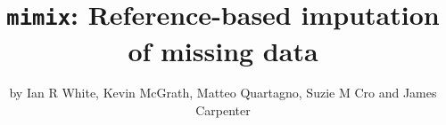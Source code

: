 



\newcommand {\varb}   [1] {{\rm var}\left(#1\right)}
\newcommand {\cov}    [2] {{\rm cov}\left(#1,#2\right)}
\newcommand {\cind}      {\mbox{$\perp\hspace{-0.5em}\perp$}}
\newcommand {\logit}  [1] {{\rm logit}\ #1}
\newcommand {\twovec}[2] {\left( \begin{array}{c} #1 \\ #2 \end{array} \right)}
\newcommand {\N} [2] {N\left(#1,#2\right)}

\newcommand {\pret}{{\le{t}}}
\newcommand {\postt}{{>t}}
\newcommand{\bX}{\boldsymbol{X}}
\newcommand{\bY}{\boldsymbol{Y}}
\newcommand {\tmax}{T} %
\newcommand{\KK}{k_1}



\title{\texttt{mimix}: Reference-based imputation of missing data}
\author{by Ian R White, Kevin McGrath, Matteo Quartagno, Suzie M Cro and James Carpenter}

\maketitle

